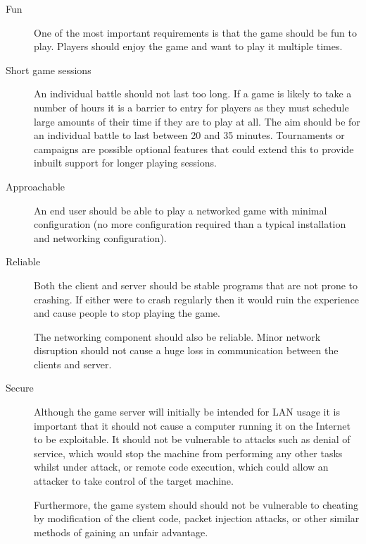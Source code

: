 \begin{description}

	\item[Fun] One of the most important requirements is that the game should be fun to play. Players should enjoy the game and want to play it multiple times.

	\item[Short game sessions] An individual battle should not last too long. If a game is likely to take a number of hours it is a barrier to entry for players as they must schedule large amounts of their time if they are to play at all. The aim should be for an individual battle to last between 20 and 35 minutes. Tournaments or campaigns are possible optional features that could extend this to provide inbuilt support for longer playing sessions.
	
	\item[Approachable]  An end user should be able to play a networked game with minimal configuration (no more configuration required than a typical installation and networking configuration).

	\item[Reliable] Both the client and server should be stable programs that are not prone to crashing. If either were to crash regularly then it would ruin the experience and cause people to stop playing the game.

	The networking component should also be reliable. Minor network disruption should not cause a huge loss in communication between the clients and server.

	\item[Secure] Although the game server will initially be intended for LAN usage it is important that it should not cause a computer running it on the Internet to be exploitable. It should not be vulnerable to attacks such as denial of service, which would stop the machine from performing any other tasks whilst under attack, or remote code execution, which could allow an attacker to take control of the target machine. 
	
	Furthermore, the game system should should not be vulnerable to cheating by modification of the client code, packet injection attacks, or other similar methods of gaining an unfair advantage. 


\end{description}

